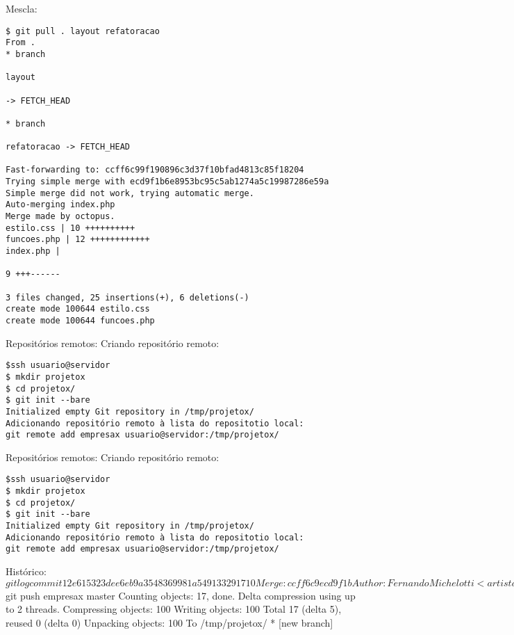 \documentclass{beamer}
\begin{document}
Mescla:
\begin{verbatim}
$ git pull . layout refatoracao
From .
* branch

layout

-> FETCH_HEAD

* branch

refatoracao -> FETCH_HEAD

Fast-forwarding to: ccff6c99f190896c3d37f10bfad4813c85f18204
Trying simple merge with ecd9f1b6e8953bc95c5ab1274a5c19987286e59a
Simple merge did not work, trying automatic merge.
Auto-merging index.php
Merge made by octopus.
estilo.css | 10 ++++++++++
funcoes.php | 12 ++++++++++++
index.php |

9 +++------

3 files changed, 25 insertions(+), 6 deletions(-)
create mode 100644 estilo.css
create mode 100644 funcoes.php
\end{verbatim}

Repositórios remotos:
Criando repositório remoto:
\begin{verbatim}
$ssh usuario@servidor
$ mkdir projetox
$ cd projetox/
$ git init --bare
Initialized empty Git repository in /tmp/projetox/
Adicionando repositório remoto à lista do repositotio local:
git remote add empresax usuario@servidor:/tmp/projetox/
\end{verbatim}

Repositórios remotos:
Criando repositório remoto:
\begin{verbatim}
$ssh usuario@servidor
$ mkdir projetox
$ cd projetox/
$ git init --bare
Initialized empty Git repository in /tmp/projetox/
Adicionando repositório remoto à lista do repositotio local:
git remote add empresax usuario@servidor:/tmp/projetox/
\end{verbatim}

Histórico:
$ git log
commit 12e615323dee6eb9a3548369981a549133291710
Merge: ccff6c9 ecd9f1b
Author: Fernando Michelotti <artista@frustrado.com.br>
Date: Tue May 31 05:25:52 2011 -0300
Merge branches 'layout' and 'refatoracao'
commit ccff6c99f190896c3d37f10bfad4813c85f18204
Author: Fernando Michelotti <artista@frustrado.com.br>
Date: Tue May 31 05:21:06 2011 -0300
Colocadas instrucoes de layout em arquivo css externo
commit ecd9f1b6e8953bc95c5ab1274a5c19987286e59a
Author: Fernando Michelotti <artista@frustrado.com.br>
Date: Tue May 31 05:04:27 2011 -0300

Repositórios remotos:
Adicionando repositório remoto à lista do repositotio local:
git remote add empresax usuario@servidor:/tmp/projetox/
Exportando branch master para repositório remoto (empresax):
$ git push empresax master
Counting objects: 17, done.
Delta compression using up to 2 threads.
Compressing objects: 100%
Writing objects: 100%
Total 17 (delta 5), reused 0 (delta 0)
Unpacking objects: 100%
To /tmp/projetox/
* [new branch]
\end{document}
